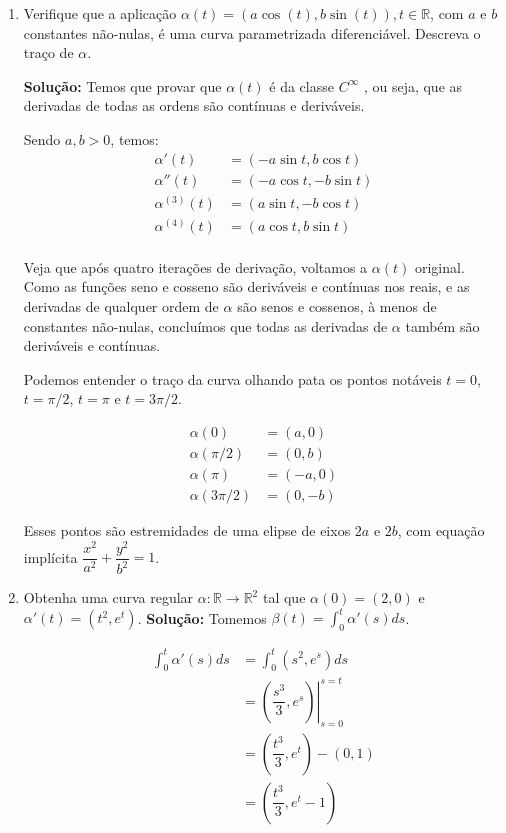 \documentclass[12pt,letterpaper]{article}
\begin{document}
\begin{enumerate}
		\item Verifique que a aplicação $\alpha(t) = (a \cos(t), b\sin(t)), t \in \mathbb{R}$, com $a$ e $b$ constantes não-nulas, é uma curva parametrizada diferenciável. Descreva o traço de $\alpha$.
		
		\subitem \textbf{Solução:} Temos que provar que $\alpha(t)$ é da classe $C^{\infty}$ \cite{ronaldo}, ou seja, que as derivadas de todas as ordens são contínuas e deriváveis.
		
		Sendo $a,b>0$, temos:
		\begin{align*}
		\alpha'(t)&=(-a\sin t,b \cos t)\\
		\alpha''(t)&=(-a\cos t,-b\sin t)\\
		\alpha^{(3)}(t)&=(a\sin t,-b\cos t)\\
		\alpha^{(4)}(t)&=(a\cos t,b\sin t)\\
		\end{align*}
		
		Veja que após quatro iterações de derivação, voltamos a $\alpha(t)$ original. Como as funções seno e cosseno são deriváveis e contínuas nos reais, e as derivadas de qualquer ordem de $\alpha$ são senos e cossenos, à menos de constantes não-nulas, concluímos que todas as derivadas de $\alpha$ também são deriváveis e contínuas.
		
		Podemos entender o traço da curva olhando pata os pontos notáveis $t=0$, $t=\pi/2$, $t=\pi$ e $t=3\pi/2$.
		
		\begin{align*}
		\alpha(0)&=(a,0)\\
		\alpha(\pi/2)&=(0,b)\\
		\alpha(\pi)&=(-a,0)\\
		\alpha(3\pi/2)&=(0,-b)
		\end{align*}
		
		Esses pontos são estremidades de uma elipse de eixos $2a$ e $2b$, com equação implícita $\dfrac{x^2}{a^2}+\dfrac{y^2}{b^2}=1$.
		\item Obtenha uma curva regular $\alpha: \mathbb{R}\to\mathbb{R}^2$ tal que $\alpha(0) = (2, 0)$ e $\alpha' (t) = (t^2 , e^t)$.
		\subitem \textbf{Solução:}
		Tomemos  $\beta(t)=\displaystyle\int_0^t\alpha'(s)ds$.
		
		\begin{align*}
		\displaystyle\int_0^t\alpha'(s)ds&=\int_0^t(s^2 , e^s)ds\\&=\left.\left(\dfrac{s^3}3,e^s\right)\right|_{s=0}^{s=t}\\
		&=\left(\dfrac{t^3}3,e^t\right)-\left(0,1\right)\\
		&=\left(\dfrac{t^3}3,e^t-1\right)
		\end{align*}
		

\end{enumerate}
\end{document}
